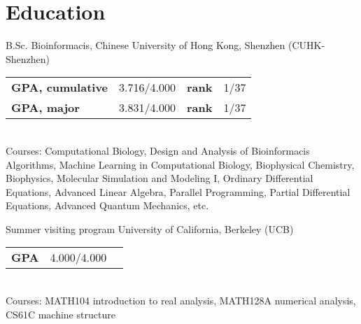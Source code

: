 \documentclass[12pt,a4paper,sans]{moderncv}
\newcommand{\cvsection}[1]{\section{{#1}}}
\begin{document}
\maketitle

\vspace{-1em}
\cvsection{Education}
    {B.Sc.}
    {}
    {Bioinformacis, Chinese University of Hong Kong, Shenzhen (CUHK-Shenzhen)}
    {}
    {\begin{tabular}{@{}lrlr@{}}
        \textbf{GPA, cumulative} & 3.716/4.000 & \textbf{rank} & 1/37\\
        \textbf{GPA, major} & 3.831/4.000      & \textbf{rank} & 1/37
    \end{tabular}\\
    \footnotesize Courses: Computational Biology, Design and Analysis of Bioinformacis Algorithms,
    Machine Learning in Computational Biology, Biophysical Chemistry, Biophysics,
    Molecular Simulation and Modeling I, Ordinary Differential Equations, Advanced Linear Algebra,
    Parallel Programming, Partial Differential Equations, Advanced Quantum Mechanics, etc.}
    {Summer visiting program}
    {}
    {University of California, Berkeley (UCB)}
    {}
    {\begin{tabular}{@{}lrr@{}}
        \textbf{GPA} & 4.000/4.000 &  \\
    \end{tabular}\\
    \footnotesize Courses: MATH104 introduction to real analysis,
    MATH128A numerical analysis, CS61C machine structure\\}
\end{document}
